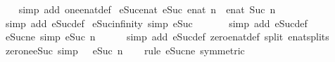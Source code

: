 \begin{isabellebody}
%
\isadelimproof
\ \ %
\endisadelimproof
%
\isatagproof
{}\isamarkupfalse%
\ {\isacharparenleft}simp\ add{\isacharcolon}\ one{\isacharunderscore}enat{\isacharunderscore}def{\isacharparenright}%
\endisatagproof
{\isafoldproof}%
%
\isadelimproof
\isanewline
%
\endisadelimproof
\isanewline
{}\isamarkupfalse%
\ eSuc{\isacharunderscore}enat{\isacharcolon}\ {\isachardoublequoteopen}eSuc\ {\isacharparenleft}enat\ n{\isacharparenright}\ {\isacharequal}\ enat\ {\isacharparenleft}Suc\ n{\isacharparenright}{\isachardoublequoteclose}\isanewline
%
\isadelimproof
\ \ %
\endisadelimproof
%
\isatagproof
{}\isamarkupfalse%
\ {\isacharparenleft}simp\ add{\isacharcolon}\ eSuc{\isacharunderscore}def{\isacharparenright}%
\endisatagproof
{\isafoldproof}%
%
\isadelimproof
\isanewline
%
\endisadelimproof
\isanewline
{}\isamarkupfalse%
\ eSuc{\isacharunderscore}infinity\ {\isacharbrackleft}simp{\isacharbrackright}{\isacharcolon}\ {\isachardoublequoteopen}eSuc\ {\isasyminfinity}\ {\isacharequal}\ {\isasyminfinity}{\isachardoublequoteclose}\isanewline
%
\isadelimproof
\ \ %
\endisadelimproof
%
\isatagproof
{}\isamarkupfalse%
\ {\isacharparenleft}simp\ add{\isacharcolon}\ eSuc{\isacharunderscore}def{\isacharparenright}%
\endisatagproof
{\isafoldproof}%
%
\isadelimproof
\isanewline
%
\endisadelimproof
\isanewline
{}\isamarkupfalse%
\ eSuc{\isacharunderscore}ne{\isacharunderscore}{}\ {\isacharbrackleft}simp{\isacharbrackright}{\isacharcolon}\ {\isachardoublequoteopen}eSuc\ n\ {\isasymnoteq}\ {}{\isachardoublequoteclose}\isanewline
%
\isadelimproof
\ \ %
\endisadelimproof
%
\isatagproof
{}\isamarkupfalse%
\ {\isacharparenleft}simp\ add{\isacharcolon}\ eSuc{\isacharunderscore}def\ zero{\isacharunderscore}enat{\isacharunderscore}def\ split{\isacharcolon}\ enat{\isachardot}splits{\isacharparenright}%
\endisatagproof
{\isafoldproof}%
%
\isadelimproof
\isanewline
%
\endisadelimproof
\isanewline
{}\isamarkupfalse%
\ zero{\isacharunderscore}ne{\isacharunderscore}eSuc\ {\isacharbrackleft}simp{\isacharbrackright}{\isacharcolon}\ {\isachardoublequoteopen}{}\ {\isasymnoteq}\ eSuc\ n{\isachardoublequoteclose}\isanewline
%
\isadelimproof
\ \ %
\endisadelimproof
%
\isatagproof
{}\isamarkupfalse%
\ {\isacharparenleft}rule\ eSuc{\isacharunderscore}ne{\isacharunderscore}{}\ {\isacharbrackleft}symmetric{\isacharbrackright}{\isacharparenright}%
\endisatagproof
{\isafoldproof}%
%
\isadelimproof
\isanewline
%
\endisadelimproof
\isanewline

\end{isabellebody}
